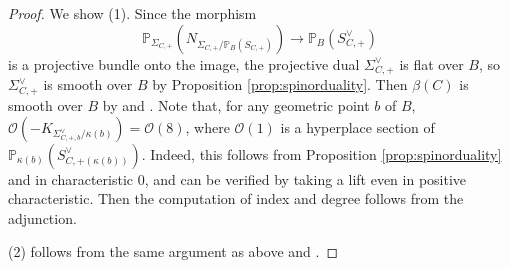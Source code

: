 \documentclass[autodetect-engine, a4paper]{amsart}
\theoremstyle{definition}
\def\P{{\mathbb P}}
\def\cO{\mathcal{O}}
\begin{document}
\begin{proof}
We show (1).
Since the morphism 
\[
\P_{\Sigma_{C,+}} (N_{\Sigma_{C,+}/\P_{B}(S_{C,+})})
\rightarrow \P_{B} (S_{C,+}^{\vee})
\]
is a projective bundle onto the image, the projective dual $\Sigma_{C,+}^{\vee}$ is flat over $B$, so $\Sigma_{C,+}^{\vee}$ is smooth over $B$ by Proposition \ref{prop:spinorduality}.
Then $\beta(C)$ is smooth over $B$ by \cite[Theorem 2.5.8]{Fu} and \cite[Lemma 3.3]{Kuznetsovspinor}.
Note that, for any geometric point $b$ of $B$, $\cO(-K_{\Sigma_{C,+,b}^{\vee}/ \kappa (b)}) = \cO(8)$, where $\cO(1)$ is a hyperplace section of $\P_{\kappa(b)} (S_{C,+ (\kappa(b))}^{\vee})$.
Indeed, this follows from Proposition \ref{prop:spinorduality} and \cite[(3.7)]{Kuznetsovfamily} in characteristic $0$, and can be verified by taking a lift even in positive characteristic.
Then the computation of index and degree follows from the adjunction.

(2) follows from the same argument as above and \cite[Proposition 2.2]{Mukaicurve}.
\end{proof}
\end{document}
